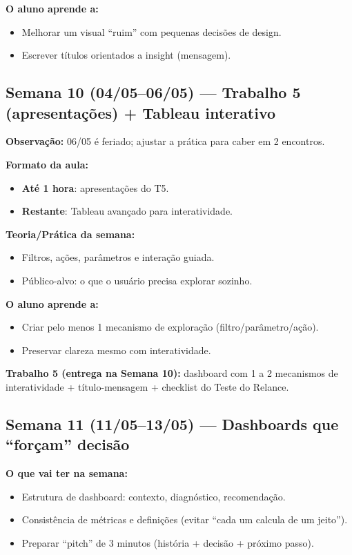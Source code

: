 \textbf{O aluno aprende a:}
\begin{itemize}[leftmargin=*]
  \item Melhorar um visual ``ruim'' com pequenas decisões de design.
  \item Escrever títulos orientados a insight (mensagem).
\end{itemize}

\subsection*{Semana 10 (04/05--06/05) --- Trabalho 5 (apresentações) + Tableau interativo}
\textbf{Observação:} 06/05 é feriado; ajustar a prática para caber em 2 encontros.

\textbf{Formato da aula:}
\begin{itemize}[leftmargin=*]
  \item \textbf{Até 1 hora}: apresentações do T5.
  \item \textbf{Restante}: Tableau avançado para interatividade.
\end{itemize}

\textbf{Teoria/Prática da semana:}
\begin{itemize}[leftmargin=*]
  \item Filtros, ações, parâmetros e interação guiada.
  \item Público-alvo: o que o usuário precisa explorar sozinho.
\end{itemize}

\textbf{O aluno aprende a:}
\begin{itemize}[leftmargin=*]
  \item Criar pelo menos 1 mecanismo de exploração (filtro/parâmetro/ação).
  \item Preservar clareza mesmo com interatividade.
\end{itemize}

\begin{SolvedBox}
\textbf{Trabalho 5 (entrega na Semana 10):} dashboard com 1 a 2 mecanismos de interatividade + título-mensagem + checklist do Teste do Relance.
\end{SolvedBox}

\subsection*{Semana 11 (11/05--13/05) --- Dashboards que ``forçam'' decisão}
\textbf{O que vai ter na semana:}
\begin{itemize}[leftmargin=*]
  \item Estrutura de dashboard: contexto, diagnóstico, recomendação.
  \item Consistência de métricas e definições (evitar ``cada um calcula de um jeito'').
  \item Preparar ``pitch'' de 3 minutos (história + decisão + próximo passo).
\end{itemize}

